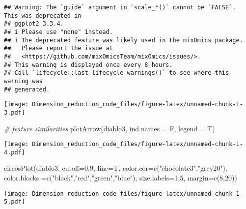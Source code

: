 \documentclass[
]{article}
\newenvironment{Shaded}{\begin{snugshade}}{\end{snugshade}}
\newcommand{\AttributeTok}[1]{\textcolor[rgb]{0.77,0.63,0.00}{#1}}
\newcommand{\CommentTok}[1]{\textcolor[rgb]{0.56,0.35,0.01}{\textit{#1}}}
\newcommand{\DecValTok}[1]{\textcolor[rgb]{0.00,0.00,0.81}{#1}}
\newcommand{\FloatTok}[1]{\textcolor[rgb]{0.00,0.00,0.81}{#1}}
\newcommand{\FunctionTok}[1]{\textcolor[rgb]{0.00,0.00,0.00}{#1}}
\newcommand{\NormalTok}[1]{#1}
\newcommand{\StringTok}[1]{\textcolor[rgb]{0.31,0.60,0.02}{#1}}
\begin{document}
\begin{verbatim}
## Warning: The `guide` argument in `scale_*()` cannot be `FALSE`. This was deprecated in
## ggplot2 3.3.4.
## i Please use "none" instead.
## i The deprecated feature was likely used in the mixOmics package.
##   Please report the issue at
##   <https://github.com/mixOmicsTeam/mixOmics/issues/>.
## This warning is displayed once every 8 hours.
## Call `lifecycle::last_lifecycle_warnings()` to see where this warning was
## generated.
\end{verbatim}

\texttt{[image: Dimension\_reduction\_code\_files/figure-latex/unnamed-chunk-1-3.pdf]}

\begin{Shaded}
\begin{Highlighting}[]
\CommentTok{\# feature similarities}
\FunctionTok{plotArrow}\NormalTok{(diablo3, }\AttributeTok{ind.names =}\NormalTok{ F, }\AttributeTok{legend  =}\NormalTok{ T)}
\end{Highlighting}
\end{Shaded}

\texttt{[image: Dimension\_reduction\_code\_files/figure-latex/unnamed-chunk-1-4.pdf]}

\begin{Shaded}
\begin{Highlighting}[]
\FunctionTok{circosPlot}\NormalTok{(diablo3, }\AttributeTok{cutoff=}\FloatTok{0.9}\NormalTok{, }\AttributeTok{line=}\NormalTok{T, }\AttributeTok{color.cor=}\FunctionTok{c}\NormalTok{(}\StringTok{"chocolate3"}\NormalTok{,}\StringTok{"grey20"}\NormalTok{),}
          \AttributeTok{color.blocks =}\FunctionTok{c}\NormalTok{(}\StringTok{"black"}\NormalTok{,}\StringTok{"red"}\NormalTok{,}\StringTok{"green"}\NormalTok{,}\StringTok{"blue"}\NormalTok{), }\AttributeTok{size.labels=}\FloatTok{1.5}\NormalTok{,}
          \AttributeTok{margin=}\FunctionTok{c}\NormalTok{(}\DecValTok{8}\NormalTok{,}\DecValTok{20}\NormalTok{))}
\end{Highlighting}
\end{Shaded}

\texttt{[image: Dimension\_reduction\_code\_files/figure-latex/unnamed-chunk-1-5.pdf]}
\end{document}

